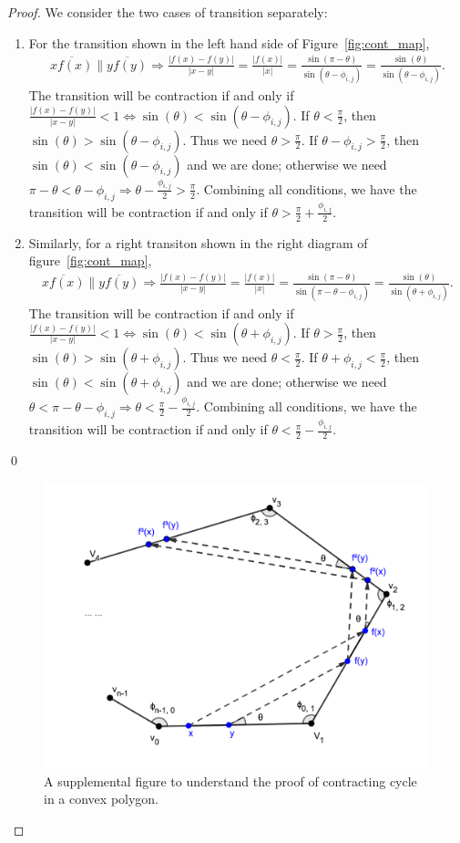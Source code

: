 \documentclass[]{styles/svproc}  %
\begin{document}
\begin{appendix}
\begin{proof}
We consider the two cases of transition separately:
\begin{enumerate}
    \item For the transition shown in the left hand side of Figure~\ref{fig:cont_map}, 
          \begin{eqnarray*}\overline{xf(x)} \parallel \overline{yf(y)} \Rightarrow \frac{|f(x)-f(y)|}{|x-y|} = \frac{|f(x)|}{|x|} = \frac{\sin(\pi - \theta)}{\sin(\theta - \phi_{i, j})} = \frac{\sin(\theta)}{\sin(\theta-\phi_{i, j})}.\end{eqnarray*} The transition will be contraction if and only if $\frac{|f(x)-f(y)|}{|x-y|} < 1 \iff \sin(\theta)<\sin(\theta-\phi_{i, j})$. If $\theta < \frac{\pi}{2}$, then $\sin(\theta) > \sin(\theta-\phi_{i, j})$. Thus we need $\theta>\frac{\pi}{2}$. If $\theta-\phi_{i, j} > \frac{\pi}{2}$, then $\sin(\theta) < \sin(\theta-\phi_{i, j})$ and we are done; otherwise we need $\pi - \theta < \theta-\phi_{i, j} \Rightarrow \theta - \frac{\phi_{i, j}}{2} > \frac{\pi}{2}$. Combining all conditions, we have the transition will be contraction if and only if $\theta >\frac{\pi}{2} + \frac{\phi_{i, j}}{2}$.
    \item Similarly, for a right transiton shown in the right diagram of figure~\ref{fig:cont_map}, \begin{eqnarray*}\overline{xf(x)} \parallel \overline{yf(y)} \Rightarrow \frac{|f(x)-f(y)|}{|x-y|} = \frac{|f(x)|}{|x|} = \frac{\sin(\pi - \theta)}{\sin(\pi -\theta-\phi_{i, j})} = \frac{\sin(\theta)}{\sin(\theta + \phi_{i, j})}.\end{eqnarray*} The transition will be contraction if and only if $\frac{|f(x)-f(y)|}{|x-y|} < 1 \iff \sin(\theta)<\sin(\theta+\phi_{i, j})$. If $\theta  > \frac{\pi}{2}$, then $\sin(\theta) > \sin(\theta + \phi_{i, j})$. Thus we need $\theta<\frac{\pi}{2}$. If $\theta+\phi_{i, j} < \frac{\pi}{2}$, then $\sin(\theta) < \sin(\theta+\phi_{i, j})$ and we are done; otherwise we need $\theta < \pi-\theta-\phi_{i, j} \Rightarrow \theta < \frac{\pi}{2} - \frac{\phi_{i, j}}{2}$. Combining all conditions, we have the transition will be contraction if and only if $\theta <\frac{\pi}{2} - \frac{\phi_{i, j}}{2}$.
\end{enumerate}
\qed

\begin{figure}
    \includegraphics[width=0.6\linewidth]{figures/convex_cycle.png}
    \centering
    \caption{A supplemental figure to understand the proof of contracting cycle in a convex polygon.\label{fig:conv_cycle}}
    \centering
\end{figure}


\end{proof}
\end{appendix}
\end{document}

